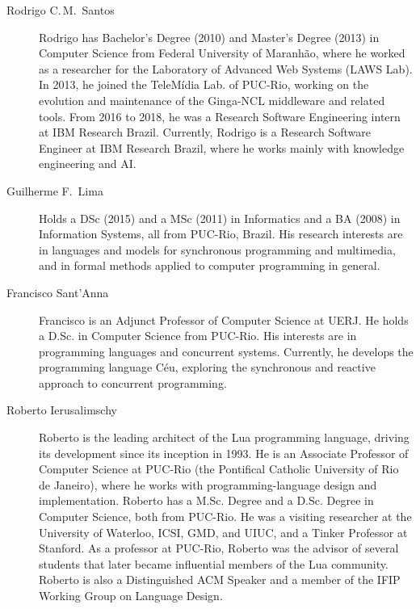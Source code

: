\documentclass{article}
\begin{document}
\newlength{\picwidth}
\setlength{\picwidth}{2.5cm}
\begin{description}
\item[Rodrigo C.\,M.~Santos] Rodrigo has Bachelor’s Degree (2010) and
  Master’s Degree (2013) in Computer Science from Federal University of
  Maranhão, where he worked as a researcher for the Laboratory of Advanced
  Web Systems (LAWS Lab). In 2013, he joined the TeleMídia Lab. of PUC-Rio,
  working on the evolution and maintenance of the Ginga-NCL middleware and
  related tools.  From 2016 to 2018, he was a Research Software Engineering
  intern at IBM Research Brazil. Currently, Rodrigo is a Research Software
  Engineer at IBM Research Brazil, where he works mainly with knowledge
  engineering and AI.

\item[Guilherme F.~Lima] Holds a DSc (2015) and a MSc (2011) in Informatics
  and a BA (2008) in Information Systems, all from PUC-Rio, Brazil.  His
  research interests are in languages and models for synchronous programming
  and multimedia, and in formal methods applied to computer programming in
  general.

\item[Francisco Sant'Anna] Francisco is an Adjunct Professor of Computer
  Science at UERJ.  He holds a D.Sc. in Computer Science from PUC-Rio.  His
  interests are in programming languages and concurrent systems.  Currently,
  he develops the programming language Céu, exploring the synchronous and
  reactive approach to concurrent programming.

\item[Roberto Ierusalimschy] Roberto is the leading architect of the Lua
  programming language, driving its development since its inception in
  1993. He is an Associate Professor of Computer Science at PUC-Rio (the
  Pontifical Catholic University of Rio de Janeiro), where he works with
  programming-language design and implementation.
  Roberto has a M.Sc. Degree and a D.Sc. Degree in Computer Science, both
  from PUC-Rio. He was a visiting researcher at the University of Waterloo,
  ICSI, GMD, and UIUC, and a Tinker Professor at Stanford. As a professor at
  PUC-Rio, Roberto was the advisor of several students that later became
  influential members of the Lua community. Roberto is also a Distinguished
  ACM Speaker and a member of the IFIP Working Group on Language Design.


\end{description}
\end{document}
